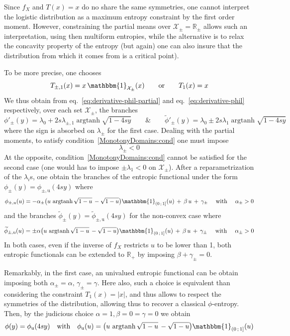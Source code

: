 \documentclass[entropy,article,submit,moreauthors,pdftex]{Definitions/mdpi}
\newcommand{\SZ}[1]{{\color{blue} #1}}                                       %
\def\Rset{\mathbb{R}}%
\def\X{\mathcal{X}}%
\def\un{\mathbbm{1}}%
\def\argtanh{\operatorname{argtanh}}%
\begin{document}
Since $f_X$ and $T(x) = x$ do no share the same symmetries, one cannot interpret
the logistic  distribution as a  maximum entropy  constraint by the  first order
moment. However, constraining the partial means over $\X_\pm = \Rset_\pm$ allows
such an interpretation, using then multiform entropies, while the alternative is
to relax  the concavity  property of  the entropy \SZ{(but  again) one  can also
  insure that the  distribution from which it comes from  is a critical point)}.
\SZ{To be more precise, one chooses
%
\[
T_{\pm,1}(x) = x \, \un_{\X_\pm}(x)
\qquad \mbox{or} \qquad T_1(x)
= x
\]
%
We     thus    obtain     from    eq.~\eqref{eq:derivative-phil-partial}     and
eq.~\eqref{eq:derivative-phil}  respectively,   over  each  set   $\X_\pm$,  the
branches
%
\[
\phi'_\pm(y)  =  \lambda_0 + 2 s \lambda_{\pm,1}  \argtanh\sqrt{1-4sy}
  \qquad \mbox{\&} \qquad 
\widetilde{\phi}'_\pm(y)    =   \lambda_0 \pm 2    s    \lambda_1
\argtanh\sqrt{1-4sy}
\]
%
where the sign is absorbed on $\lambda_\pm$ for the first case. Dealing with the
partial  moments,  to   satisfy  condition~\ref{MonotonyDomains:cond}  one  must
impose $$\lambda_\pm < 0$$ At the opposite, condition~\ref{MonotonyDomains:cond}
cannot be satisfied for the second case  (one would has to impose $\pm \lambda_1
< 0$  on $\X_\pm$).  After a  reparametrization of the $\lambda_i$s,  one obtain
the  branches  of  the  entropic   functional  under  the  form  $\phi_\pm(y)  =
\phi_{\pm,\mathrm{u}}(4 s y)$ where
%
\[
\phi_{\pm,\mathrm{u}}(u)  = -  \alpha_\pm \left(  u \,  \argtanh\sqrt{1-u} \,  -
\sqrt{1-u} \right) \un_{\left( 0  \, ; \, 1 \right]}(u) \, + \,  \beta \, u \, +
\, \gamma_\pm \quad \mbox{ with } \quad \alpha_\pm > 0
\]
%
and the branches  $\widetilde{\phi}_\pm(y) = \widetilde{\phi}_{\pm,\mathrm{u}}(4
s y)$ for the non-convex case where
%
\[
\widetilde{\phi}_{\pm,\mathrm{u}}(u)  = \pm \alpha \left(  u \,  \argtanh\sqrt{1-u} \,  -
\sqrt{1-u} \right) \un_{\left( 0  \, ; \, 1 \right]}(u) \, + \,  \beta \, u \, +
\, \gamma_\pm \quad \mbox{ with } \quad \alpha_\pm > 0
\]
%
In both cases,  even if the inverse of  $f_X$ restricts $u$ to be  lower than 1,
both entropic  functionals can  be extended  to $\Rset_+$  by imposing  $\beta +
\gamma_\pm = 0$.


Remarkably, in  the first case, an  univalued entropic functional can  be obtain
imposing both $\alpha_\pm = \alpha, \,  \gamma_\pm = \gamma$.  Here also, such a
choice is  equivalent than considering the  constraint $T_1(x) = |x|$,  and thus
allows to respect the symmetries of the distribution, allowing thus to recover a
classical $\phi$-entropy.  Then, by the judicious  choice $\alpha = 1, \beta = 0
= \gamma = 0$ we obtain
%
\[
\phi(y) = \phi_{\mathrm{u}}(4 s  y) \quad \mbox{with} \quad \phi_{\mathrm{u}}(u)
= \left( u \, \argtanh\sqrt{1-u} \, - \sqrt{1-u} \right) \un_{\left( 0 \, ; \, 1
  \right]}(u)
\]

}
\end{document}
